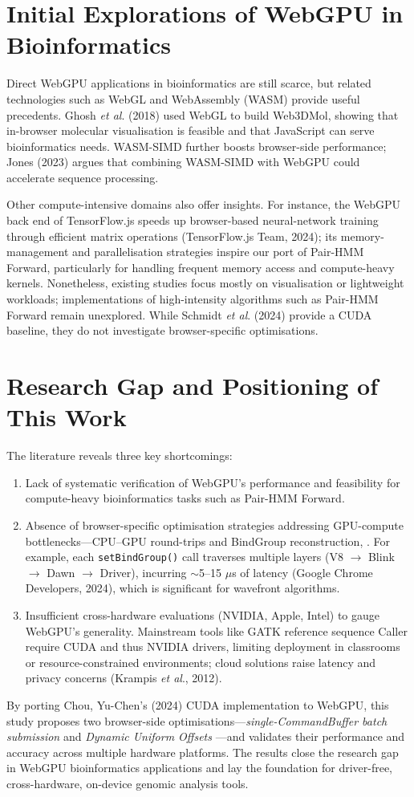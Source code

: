 \documentclass[PhD]{PHlab-thesis}
\begin{document}
\section{Initial Explorations of WebGPU in Bioinformatics}
Direct WebGPU applications in bioinformatics are still scarce, but related technologies such as WebGL and WebAssembly (WASM) provide useful precedents. Ghosh \emph{et al}. (2018) used WebGL to build Web3DMol, showing that in-browser molecular visualisation is feasible and that JavaScript can serve bioinformatics needs. WASM-SIMD further boosts browser-side performance; Jones (2023) argues that combining WASM-SIMD with WebGPU could accelerate sequence processing.

Other compute-intensive domains also offer insights. For instance, the WebGPU back end of TensorFlow.js speeds up browser-based neural-network training through efficient matrix operations (TensorFlow.js Team, 2024); its memory-management and parallelisation strategies inspire our port of Pair-HMM Forward, particularly for handling frequent memory access and compute-heavy kernels. Nonetheless, existing studies focus mostly on visualisation or lightweight workloads; implementations of high-intensity algorithms such as Pair-HMM Forward remain unexplored. While Schmidt \emph{et al}. (2024) provide a CUDA baseline, they do not investigate browser-specific optimisations.

\section{Research Gap and Positioning of This Work}
The literature reveals three key shortcomings:
\begin{enumerate}
    \item Lack of systematic verification of WebGPU's performance and feasibility for compute-heavy bioinformatics tasks such as Pair-HMM Forward.
    \item Absence of browser-specific optimisation strategies addressing GPU-compute bottlenecks—CPU–GPU round-trips and BindGroup reconstruction, . For example, each \texttt{setBindGroup()} call traverses multiple layers (V8 $\rightarrow$ Blink $\rightarrow$ Dawn $\rightarrow$ Driver), incurring $\sim$5–15 $\mu$s of latency (Google Chrome Developers, 2024), which is significant for wavefront algorithms.
    \item Insufficient cross-hardware evaluations (NVIDIA, Apple, Intel) to gauge WebGPU's generality. Mainstream tools like GATK reference sequence Caller require CUDA and thus NVIDIA drivers, limiting deployment in classrooms or resource-constrained environments; cloud solutions raise latency and privacy concerns (Krampis \emph{et al}., 2012).
\end{enumerate}
By porting Chou, Yu-Chen's (2024) CUDA implementation to WebGPU, this study proposes two browser-side optimisations—\emph{single-CommandBuffer batch submission} and \emph{Dynamic Uniform Offsets} —and validates their performance and accuracy across multiple hardware platforms. The results close the research gap in WebGPU bioinformatics applications and lay the foundation for driver-free, cross-hardware, on-device genomic analysis tools.
\end{document}
